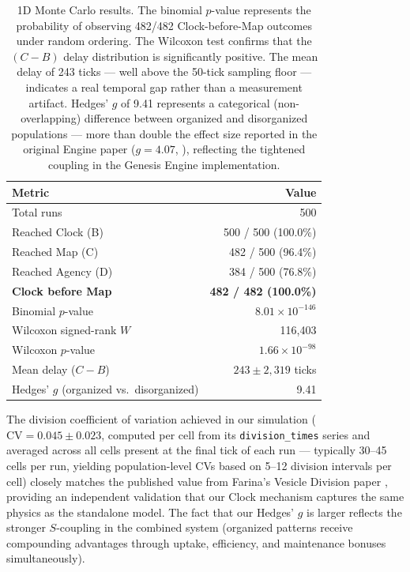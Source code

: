 \documentclass[11pt,letterpaper]{article}
\begin{document}
\begin{table}[H]
\centering
\small
\begin{tabular}{lr}
\toprule
\textbf{Metric} & \textbf{Value} \\
\midrule
Total runs & 500 \\
Reached Clock (B) & 500 / 500 (100.0\%) \\
Reached Map (C) & 482 / 500 (96.4\%) \\
Reached Agency (D) & 384 / 500 (76.8\%) \\
\midrule
\textbf{Clock before Map} & \textbf{482 / 482 (100.0\%)} \\
Binomial $p$-value & $8.01 \times 10^{-146}$ \\
Wilcoxon signed-rank $W$ & 116{,}403 \\
Wilcoxon $p$-value & $1.66 \times 10^{-98}$ \\
Mean delay ($C - B$) & $243 \pm 2{,}319$ ticks \\
Hedges' $g$ (organized vs.\ disorganized) & 9.41 \\
\bottomrule
\end{tabular}
\caption{\label{tab:1d}1D Monte Carlo results. The binomial $p$-value represents the probability of observing 482/482 Clock-before-Map outcomes under random ordering. The Wilcoxon test confirms that the $(C - B)$ delay distribution is significantly positive. The mean delay of 243 ticks --- well above the 50-tick sampling floor --- indicates a real temporal gap rather than a measurement artifact. Hedges' $g$ of 9.41 represents a categorical (non-overlapping) difference between organized and disorganized populations --- more than double the effect size reported in the original Engine paper ($g = 4.07$, \citealt{farina2025engine}), reflecting the tightened coupling in the Genesis Engine implementation.}
\end{table}

The division coefficient of variation achieved in our simulation ($\mathrm{CV} = 0.045 \pm 0.023$, computed per cell from its \texttt{division\_times} series and averaged across all cells present at the final tick of each run --- typically 30--45 cells per run, yielding population-level CVs based on 5--12 division intervals per cell) closely matches the published value from Farina's Vesicle Division paper \citep[$\mathrm{CV} = 0.06$,][]{farina2025vesicle}, providing an independent validation that our Clock mechanism captures the same physics as the standalone model. The fact that our Hedges' $g$ is larger reflects the stronger $S$-coupling in the combined system (organized patterns receive compounding advantages through uptake, efficiency, and maintenance bonuses simultaneously).
\end{document}
